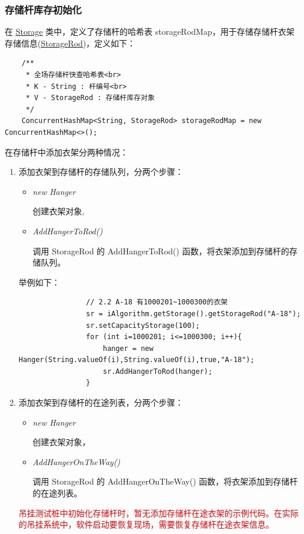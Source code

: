 \subsubsection{存储杆库存初始化}
在 \hyperref[sec:param-storage]{\underline{Storage}}  类中，定义了存储杆的哈希表 storageRodMap，用于存储存储杆衣架存储信息(\hyperref[sec:param-storageRod]{\underline{StorageRod}})，定义如下：
\begin{lstlisting}
    /**
     * 全场存储杆快查哈希表<br>
     * K - String : 杆编号<br>
     * V - StorageRod : 存储杆库存对象
     */
    ConcurrentHashMap<String, StorageRod> storageRodMap = new ConcurrentHashMap<>();
\end{lstlisting}\vspace{-30pt}
在存储杆中添加衣架分两种情况：
\begin{enumerate}[label=\arabic*)]
    \item 添加衣架到存储杆的存储队列，分两个步骤：
    \begin{itemize}
        \item \hypertarget{1}{\it{new Hanger}} %
        创建衣架对象,
        \item \hypertarget{2}{\it{AddHangerToRod()}} %
        调用 StorageRod 的 AddHangerToRod() 函数，将衣架添加到存储杆的存储队列。
    \end{itemize}
        举例如下：
        \begin{lstlisting}
                // 2.2 A-18 有1000201~1000300的衣架
                sr = iAlgorithm.getStorage().getStorageRod("A-18");
                sr.setCapacityStorage(100);
                for (int i=1000201; i<=1000300; i++){
                    hanger = new Hanger(String.valueOf(i),String.valueOf(i),true,"A-18");
                    sr.AddHangerToRod(hanger);
                }
        \end{lstlisting}\vspace{-30pt}
    \item 添加衣架到存储杆的在途列表，分两个步骤：
    \begin{itemize}
        \item \hypertarget{1}{\it{new Hanger}}
        创建衣架对象，
        \item \hypertarget{2}{\it{AddHangerOnTheWay()}}
        调用 StorageRod 的  AddHangerOnTheWay() 函数，将衣架添加到存储杆的在途列表。
    \end{itemize}
    \textcolor{red}{吊挂测试桩中初始化存储杆时，暂无添加存储杆在途衣架的示例代码。在实际的吊挂系统中，软件启动要恢复现场，需要恢复存储杆在途衣架信息。}
\end{enumerate}
\par{}
